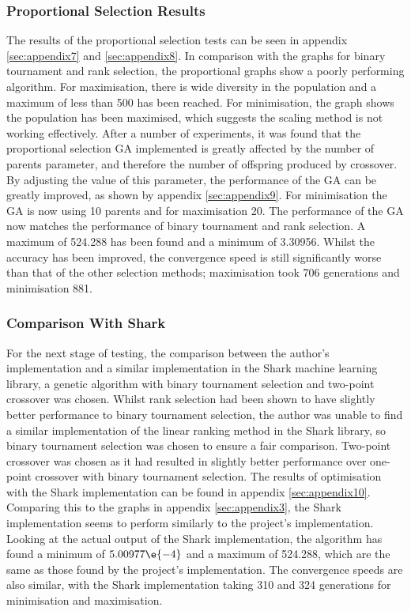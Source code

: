\subsubsection{Proportional Selection Results}
The results of the proportional selection tests can be seen in appendix \ref{sec:appendix7} and \ref{sec:appendix8}. In comparison with the graphs for binary tournament and rank selection, the proportional graphs show a poorly performing algorithm. For maximisation, there is wide diversity in the population and a maximum of less than 500 has been reached. For minimisation, the graph shows the population has been maximised, which suggests the scaling method is not working effectively. After a number of experiments, it was found that the proportional selection GA implemented is greatly affected by the number of parents parameter, and therefore the number of offspring produced by crossover. By adjusting the value of this parameter, the performance of the GA can be greatly improved, as shown by appendix \ref{sec:appendix9}. For minimisation the GA is now using 10 parents and for maximisation 20. The performance of the GA now matches the performance of binary tournament and rank selection. A maximum of 524.288 has been found and a minimum of 3.30956. Whilst the accuracy has been improved, the convergence speed is still significantly worse than that of the other selection methods; maximisation took 706 generations and minimisation 881.

\subsubsection{Comparison With Shark}
For the next stage of testing, the comparison between the author's implementation and a similar implementation in the Shark machine learning library, a genetic algorithm with binary tournament selection and two-point crossover was chosen. Whilst rank selection had been shown to have slightly better performance to binary tournament selection, the author was unable to find a similar implementation of the linear ranking method in the Shark library, so binary tournament selection was chosen to ensure a fair comparison. Two-point crossover was chosen as it had resulted in slightly better performance over one-point crossover with binary tournament selection. The results of optimisation with the Shark implementation can be found in appendix \ref{sec:appendix10}. Comparing this to the graphs in appendix \ref{sec:appendix3}, the Shark implementation seems to perform similarly to the project's implementation. Looking at the actual output of the Shark implementation, the algorithm has found a minimum of $5.00977\e{-4}$ and a maximum of 524.288, which are the same as those found by the project's implementation. The convergence speeds are also similar, with the Shark implementation taking 310 and 324 generations for minimisation and maximisation. 

